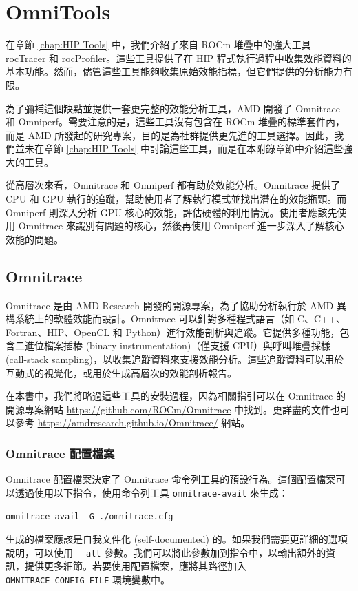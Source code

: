 \chapter{OmniTools}\label{AppendiceC}

在章節 \ref{chap:HIP Tools} 中，我們介紹了來自 ROCm 堆疊中的強大工具 rocTracer 和 rocProfiler。這些工具提供了在 HIP 程式執行過程中收集效能資料的基本功能。然而，儘管這些工具能夠收集原始效能指標，但它們提供的分析能力有限。

為了彌補這個缺點並提供一套更完整的效能分析工具，AMD 開發了 Omnitrace 和 Omniperf。需要注意的是，這些工具沒有包含在 ROCm 堆疊的標準套件內，而是 AMD 所發起的研究專案，目的是為社群提供更先進的工具選擇。因此，我們並未在章節 \ref{chap:HIP Tools} 中討論這些工具，而是在本附錄章節中介紹這些強大的工具。

從高層次來看，Omnitrace 和 Omniperf 都有助於效能分析。Omnitrace 提供了 CPU 和 GPU 執行的追蹤，幫助使用者了解執行模式並找出潛在的效能瓶頸。而 Omniperf 則深入分析 GPU 核心的效能，評估硬體的利用情況。使用者應該先使用 Omnitrace 來識別有問題的核心，然後再使用 Omniperf 進一步深入了解核心效能的問題。


\section{Omnitrace}
Omnitrace 是由 AMD Research 開發的開源專案，為了協助分析執行於 AMD 異構系統上的軟體效能而設計。Omnitrace 可以針對多種程式語言（如 C、C++、Fortran、HIP、OpenCL 和 Python）進行效能剖析與追蹤。它提供多種功能，包含二進位檔案插樁 (binary instrumentation)（僅支援 CPU）與呼叫堆疊採樣 (call-stack sampling)，以收集追蹤資料來支援效能分析。這些追蹤資料可以用於互動式的視覺化，或用於生成高層次的效能剖析報告。

在本書中，我們將略過這些工具的安裝過程，因為相關指引可以在 Omnitrace 的開源專案網站 \url{https://github.com/ROCm/Omnitrace} 中找到。更詳盡的文件也可以參考 \url{https://amdresearch.github.io/Omnitrace/} 網站。

\subsection{Omnitrace 配置檔案}
Omnitrace 配置檔案決定了 Omnitrace 命令列工具的預設行為。這個配置檔案可以透過使用以下指令，使用命令列工具 \lstinline|omnitrace-avail| 來生成：

\lstinline|omnitrace-avail -G ./omnitrace.cfg|

生成的檔案應該是自我文件化 (self-documented) 的。如果我們需要更詳細的選項說明，可以使用 \lstinline|--all| 參數。我們可以將此參數加到指令中，以輸出額外的資訊，提供更多細節。若要使用配置檔案，應將其路徑加入 \lstinline|OMNITRACE_CONFIG_FILE| 環境變數中。


